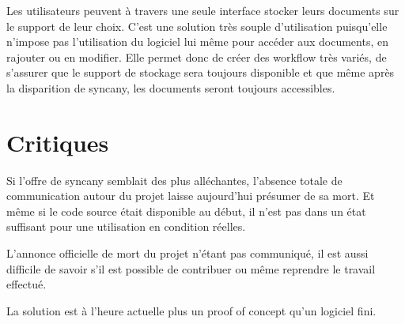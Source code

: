 Les utilisateurs peuvent à travers une seule interface stocker leurs documents sur le support de leur choix. C'est une solution très souple d'utilisation puisqu'elle n'impose pas l'utilisation du logiciel lui même pour accéder aux documents, en rajouter ou en modifier. Elle permet donc de créer des workflow très variés, de s'assurer que le support de stockage sera toujours disponible et que même après la disparition de syncany, les documents seront toujours accessibles.

\section{Critiques}
Si l'offre de syncany semblait des plus alléchantes, l'absence totale de communication autour du projet laisse aujourd'hui présumer de sa mort. Et même si le code source était disponible au début, il n'est pas dans un état suffisant pour une utilisation en condition réelles.

L'annonce officielle de mort du projet n'étant pas communiqué, il est aussi difficile de savoir s'il est possible de contribuer ou même reprendre le travail effectué.

La solution est à l'heure actuelle plus un proof of concept qu'un logiciel fini.
